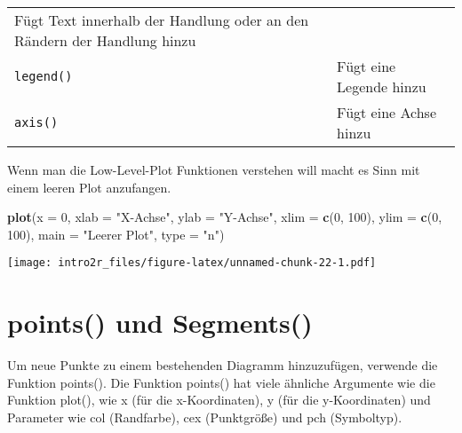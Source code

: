 \documentclass[
]{book}
\newenvironment{Shaded}{\begin{snugshade}}{\end{snugshade}}
\newcommand{\DataTypeTok}[1]{\textcolor[rgb]{0.13,0.29,0.53}{#1}}
\newcommand{\DecValTok}[1]{\textcolor[rgb]{0.00,0.00,0.81}{#1}}
\newcommand{\KeywordTok}[1]{\textcolor[rgb]{0.13,0.29,0.53}{\textbf{#1}}}
\newcommand{\NormalTok}[1]{#1}
\newcommand{\StringTok}[1]{\textcolor[rgb]{0.31,0.60,0.02}{#1}}
\begin{document}
\begin{longtable}[]{@{}ll@{}}
\begin{minipage}[t]{0.71\columnwidth}
Fügt Text innerhalb der Handlung oder an den Rändern der Handlung hinzu\strut
\end{minipage}\tabularnewline
\begin{minipage}[t]{0.24\columnwidth}\raggedright
\texttt{legend()}\strut
\end{minipage} & \begin{minipage}[t]{0.71\columnwidth}\raggedright
Fügt eine Legende hinzu\strut
\end{minipage}\tabularnewline
\begin{minipage}[t]{0.24\columnwidth}\raggedright
\texttt{axis()}\strut
\end{minipage} & \begin{minipage}[t]{0.71\columnwidth}\raggedright
Fügt eine Achse hinzu\strut
\end{minipage}\tabularnewline
\bottomrule
\end{longtable}

Wenn man die Low-Level-Plot Funktionen verstehen will macht es Sinn mit einem leeren Plot anzufangen.

\begin{Shaded}
\begin{Highlighting}[]
\KeywordTok{plot}\NormalTok{(}\DataTypeTok{x =} \DecValTok{0}\NormalTok{,                 }
     \DataTypeTok{xlab =} \StringTok{"X-Achse"}\NormalTok{, }
     \DataTypeTok{ylab =} \StringTok{"Y-Achse"}\NormalTok{,}
     \DataTypeTok{xlim =} \KeywordTok{c}\NormalTok{(}\DecValTok{0}\NormalTok{, }\DecValTok{100}\NormalTok{), }
     \DataTypeTok{ylim =} \KeywordTok{c}\NormalTok{(}\DecValTok{0}\NormalTok{, }\DecValTok{100}\NormalTok{),}
     \DataTypeTok{main =} \StringTok{"Leerer Plot"}\NormalTok{,}
     \DataTypeTok{type =} \StringTok{"n"}\NormalTok{)}
\end{Highlighting}
\end{Shaded}

\texttt{[image: intro2r\_files/figure-latex/unnamed-chunk-22-1.pdf]}

\hypertarget{points-und-segments}{%
\section{points() und Segments()}\label{points-und-segments}}

Um neue Punkte zu einem bestehenden Diagramm hinzuzufügen, verwende die Funktion points().
Die Funktion points() hat viele ähnliche Argumente wie die Funktion plot(), wie x (für die x-Koordinaten),
y (für die y-Koordinaten) und Parameter wie col (Randfarbe), cex (Punktgröße) und pch (Symboltyp).
\end{document}
